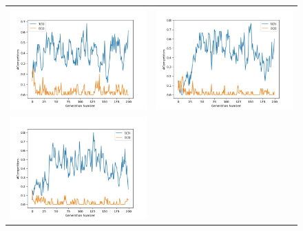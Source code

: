 \documentclass{article}
\begin{document}
	\begin{figure}[H]
		\centering
		\begin{adjustbox}{width=0.6\paperwidth}
			\begin{tabular}{c c}
				\includegraphics{Codes/Problem_1 Construction_1/Comp_1.jpg} & \includegraphics{Codes/Problem_1 Construction_1/Comp_2.jpg} \\
				\includegraphics{Codes/Problem_1 Construction_1/Comp_3.jpg}&

\end{tabular}
\end{adjustbox}
\end{figure}
\end{document}
